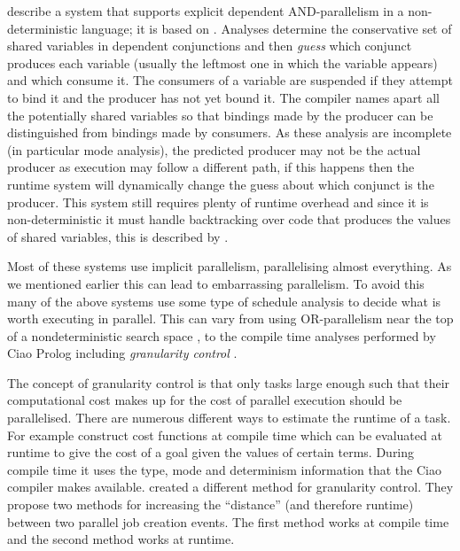 \citet*{pontelli:1996:ddas} describe a system that supports explicit
dependent AND-parallelism in a non-deterministic language;
it is based on \citet{gupta:1991:ace}.
Analyses determine the conservative set of shared variables in dependent
conjunctions and then \emph{guess} which conjunct produces each variable
(usually the leftmost one in which the variable appears) and which consume it.
The consumers of a variable are suspended if they attempt to bind it and the
producer has not yet bound it.
The compiler names apart all the potentially shared variables so
that bindings made by the producer can be distinguished
from bindings made by consumers.
As these analysis are incomplete (in particular mode analysis),
the predicted producer may not be the actual producer as execution may
follow a different path,
if this happens then the runtime system will dynamically change the guess
about which conjunct is the producer.
This system still requires plenty of runtime overhead and since it is
non-deterministic it must handle backtracking over code that produces the
values of shared variables,
this is described by \citet{shen:1996:daswam}.

Most of these systems use implicit parallelism, parallelising almost
everything.
As we mentioned earlier this can lead to embarrassing parallelism.
To avoid this many of the above systems use some type of schedule analysis
to decide what is worth executing in parallel.
This can vary from using OR-parallelism near the top of a nondeterministic
search space \citep{hausman:1987:or},
to the compile time analyses performed by Ciao Prolog
\citep{hermenegildo_ciao} including \emph{granularity control}
\citep{lopez96:distance_granularity}.

The concept of granularity control
\citep{debray:1990:granularity} is that only tasks
large enough such that their computational cost makes up for the cost of
parallel execution should be parallelised.
There are numerous different ways to estimate the runtime of a task.
For example \citet*{lopez96:distance_granularity} construct cost functions
at compile time which can be evaluated at runtime to give the cost of a
goal given the values of certain terms.
During compile time it uses the type, mode and determinism information that
the Ciao compiler makes available.
\citet*{shen_98_granularity-control} created a different method for
granularity control.
They propose two methods for increasing the ``distance''
(and therefore runtime)
between two parallel job creation events.
The first method works at compile time and the second method works at
runtime.

